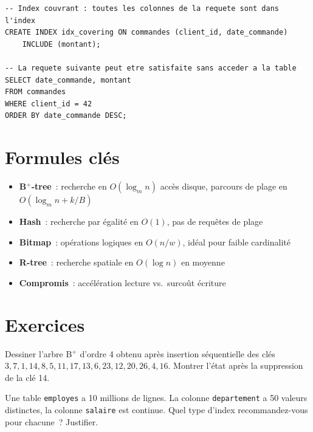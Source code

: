 \begin{exemple}
\begin{verbatim}
-- Index couvrant : toutes les colonnes de la requete sont dans l'index
CREATE INDEX idx_covering ON commandes (client_id, date_commande)
    INCLUDE (montant);

-- La requete suivante peut etre satisfaite sans acceder a la table
SELECT date_commande, montant
FROM commandes
WHERE client_id = 42
ORDER BY date_commande DESC;
\end{verbatim}
\end{exemple}

\section{Formules cl\'es}

\begin{formules}
\begin{itemize}
  \item \textbf{B$^+$-tree}~: recherche en $O(\log_m n)$ acc\`es disque, parcours de plage en $O(\log_m n + k/B)$
  \item \textbf{Hash}~: recherche par \'egalit\'e en $O(1)$, pas de requ\^etes de plage
  \item \textbf{Bitmap}~: op\'erations logiques en $O(n/w)$, id\'eal pour faible cardinalit\'e
  \item \textbf{R-tree}~: recherche spatiale en $O(\log n)$ en moyenne
  \item \textbf{Compromis}~: acc\'el\'eration lecture vs.\ surco\^ut \'ecriture
\end{itemize}
\end{formules}

\section{Exercices}

\begin{exercice}
Dessiner l'arbre B$^+$ d'ordre 4 obtenu apr\`es insertion s\'equentielle
des cl\'es $3, 7, 1, 14, 8, 5, 11, 17, 13, 6, 23, 12, 20, 26, 4, 16$.
Montrer l'\'etat apr\`es la suppression de la cl\'e 14.
\end{exercice}

\begin{exercice}
Une table \texttt{employes} a 10 millions de lignes. La colonne
\texttt{departement} a 50 valeurs distinctes, la colonne \texttt{salaire}
est continue. Quel type d'index recommandez-vous pour chacune~? Justifier.
\end{exercice}

